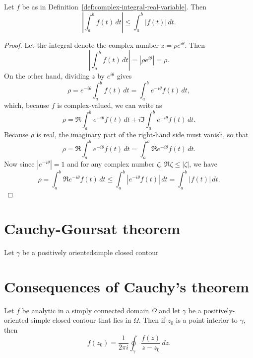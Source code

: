 \begin{theorem}
    Let \(f\) be as in Definition~\ref{def:complex-integral-real-variable}. Then
    \[
        \left| \int_a^b f(t) \, dt \right| \leq \int_a^b |f(t)| \, dt.
    \]
    \label{thm:modulus-integral-inequality}
\end{theorem}

\begin{proof}
    Let the integral denote the complex number \(z = \rho e^{i\theta}\). Then
    \[
        \left| \int_a^b f(t) \, dt \right| = \left| \rho e^{i\theta} \right| = \rho.
    \]
    On the other hand, dividing \(z\) by \(e^{i\theta}\) gives
    \[
        \rho = e^{-i\theta} \int_a^b f(t) \, dt = \int_a^b e^{-i\theta} f(t) \, dt,
    \]
    which, because \(f\) is complex-valued, we can write as
    \[
        \rho = \Re \int_a^b e^{-i\theta} f(t) \, dt + i \Im \int_a^b e^{-i\theta} f(t) \, dt.
    \]
    Because \(\rho\) is real, the imaginary part of the right-hand side must
    vanish, so that
    \[
        \rho = \Re \int_a^b e^{-i\theta} f(t) \, dt = \int_a^b \Re e^{-i\theta} f(t) \, dt.
    \]
    Now since \(|e^{-i\theta}| = 1\) and for any complex number \(\zeta\), \(\Re \zeta \leq |\zeta|\), we have
    \[
        \rho = \int_a^b \Re e^{-i\theta} f(t) \, dt \leq \int_a^b |e^{-i\theta} f(t)| \, dt = \int_a^b |f(t)| \, dt.
    \]
\end{proof}


\section{Cauchy-Goursat theorem}

\begin{theorem}
    Let \(\gamma\) be a positively orientedsimple closed contour 
\end{theorem}

\section{Consequences of Cauchy's theorem}

\begin{theorem}
    Let \(f\) be analytic in a simply connected domain \(\Omega\) and let
    \(\gamma\) be a positively-oriented simple closed contour that lies in
    \(\Omega\). Then if \(z_0\) is a point interior to \(\gamma\), then
    \[
        f(z_0) = \frac{1}{2\pi i} \oint_\gamma \frac{f(z)}{z - z_0} \, dz.
    \]
    \label{thm:cauchys-integral-formula}
\end{theorem}

